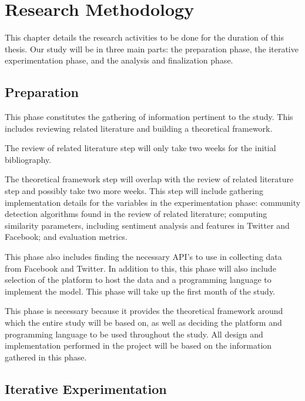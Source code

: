 %
%
%                 

\chapter{Research Methodology}
This chapter details the research activities to be done for the duration of this thesis. Our study will be in three main parts: the preparation phase, the iterative experimentation phase, and the analysis and finalization phase.

\section{Preparation}

This phase constitutes the gathering of information pertinent to the study. This includes reviewing related literature and building a theoretical framework.

The review of related literature step will only take two weeks for the initial bibliography. 

The theoretical framework step will overlap with the review of related literature step and possibly take two more weeks. This step will include gathering implementation details for the variables in the experimentation phase: community detection algorithms found in the review of related literature; computing similarity parameters, including sentiment analysis and features in Twitter and Facebook; and evaluation metrics. 

This phase also includes finding the necessary API’s to use in collecting data from Facebook and Twitter. In addition to this, this phase will also include selection of the platform to host the data and a programming language to implement the model. This phase will take up the first month of the study. 

This phase is necessary because it provides the theoretical framework around which the entire study will be based on, as well as deciding the platform and programming language to be used throughout the study. All design and implementation performed in the project will be based on the information gathered in this phase.

\section{Iterative Experimentation}

